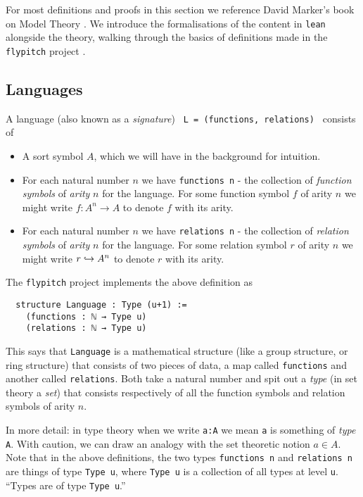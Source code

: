 For most definitions and proofs in this section we reference
David Marker's book on Model Theory \cite{marker}.
We introduce the formalisations of the content in \texttt{lean} alongside the theory,
walking through the basics of definitions made in the \texttt{flypitch} project \cite{flypitch}.

\subsection{Languages}
\begin{dfn}[Language]
  A language (also known as a \textit{signature}) \texttt{ L = (functions, relations) } consists of

  \begin{itemize}
    \item A sort symbol $A$, which we will have in the background for intuition.
    \item For each natural number $n$ we have \texttt{functions n} -
          the collection of \textit{function symbols} of \textit{arity} $n$ for the language.
          For some function symbol $f$ of arity $n$ we might write
          $f : A^{n} \to A$ to denote $f$ with its arity.
    \item For each natural number $n$ we have \texttt{relations n} -
          the collection of \textit{relation symbols} of \textit{arity} $n$ for the language.
          For some relation symbol $r$ of arity $n$ we might write
          $r \hookrightarrow A^{n}$ to denote $r$ with its arity.
  \end{itemize}

  The \texttt{flypitch} project implements the above definition as

  \begin{lstlisting}
  structure Language : Type (u+1) :=
    (functions : ℕ → Type u)
    (relations : ℕ → Type u)\end{lstlisting}

  This says that \texttt{Language} is a mathematical structure
  (like a group structure, or ring structure)
  that consists of two pieces of data,
  a map called \texttt{functions} and another called \texttt{relations}.
  Both take a natural number and spit out a \textit{type}
  (in set theory a \textit{set})
  that consists respectively of all the function symbols and relation symbols
  of arity $n$.

  In more detail: in type theory when we write \texttt{a:A} we mean \texttt{a} is something
  of \textit{type} \texttt{A}.
  With caution, we can draw an analogy with the set theoretic notion $a \in A$.
  Note that in the above definitions, the two types
  \texttt{functions n} and \texttt{relations n} are things of type \texttt{Type u},
  where \texttt{Type u} is a collection of all types at level \texttt{u}.
  ``Types are of type \texttt{Type u}.''


\end{dfn}
